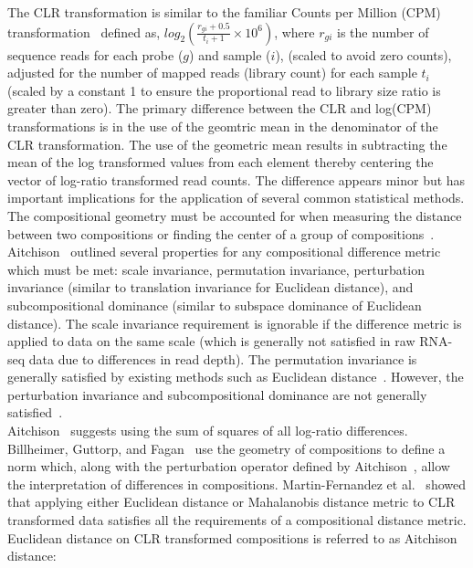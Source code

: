 \documentclass{article}\usepackage[]{graphicx}\usepackage[]{color}
\theoremstyle{definition}
\begin{document}
The CLR transformation is similar to the familiar Counts per Million (CPM) transformation~\cite{Law2014} defined as, $log_2 \left(\frac{r_{gi}+0.5}{t_i+1} \times 10^6 \right)$, where $r_{gi}$ is the number of sequence reads for each probe ($g$) and sample ($i$), (scaled to avoid zero counts), adjusted for the number of mapped reads (library count) for each sample $t_i$ (scaled by a constant 1 to ensure the proportional read to library size ratio is greater than zero). The primary difference between the CLR and log(CPM) transformations is in the use of the geomtric mean in the denominator of the CLR transformation. The use of the geometric mean results in subtracting the mean of the log transformed values from each element thereby centering the vector of log-ratio transformed read counts. The difference appears minor but has important implications for the application of several common statistical methods.\\


The compositional geometry must be accounted for when measuring the distance between two compositions or finding the center of a group of compositions~\cite{Aitchison2000}.  Aitchison~\cite{Aitchison1992} outlined several properties for any compositional difference metric which must be met: scale invariance, permutation invariance, perturbation invariance (similar to translation invariance for Euclidean distance), and subcompositional dominance (similar to subspace dominance of Euclidean distance).  The scale invariance requirement is ignorable if the difference metric is applied to data on the same scale (which is generally not satisfied in raw RNA-seq data due to differences in read depth). The permutation invariance is generally satisfied by existing methods such as Euclidean distance~\cite{Martin-Fernandez1998}. However, the perturbation invariance and subcompositional dominance are not generally satisfied~\cite{Martin-Fernandez1998}. \\

Aitchison~\cite{Aitchison1986, Aitchison1992} suggests using the sum of squares of all log-ratio differences.  Billheimer, Guttorp, and Fagan~\cite{Billheimer2001} use the geometry of compositions to define a norm which, along with the perturbation operator defined by Aitchison~\cite{Aitchison1986}, allow the interpretation of differences in compositions. Martin-Fernandez et al.~\cite{Martin-Fernandez1998} showed that applying either Euclidean distance or Mahalanobis distance metric to CLR transformed data satisfies all the requirements of a compositional distance metric. Euclidean distance on CLR transformed compositions is referred to as Aitchison distance:
\end{document}
